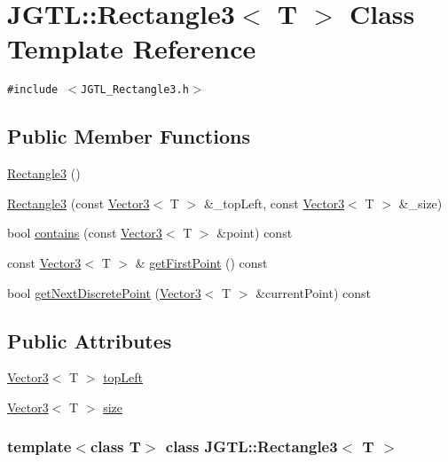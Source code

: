 \hypertarget{class_j_g_t_l_1_1_rectangle3}{
\section{JGTL::Rectangle3$<$ T $>$ Class Template Reference}
\label{class_j_g_t_l_1_1_rectangle3}
}
{\tt \#include $<$JGTL\_\-Rectangle3.h$>$}

\subsection*{Public Member Functions}
\begin{CompactItemize}
\item 
\hyperlink{class_j_g_t_l_1_1_rectangle3_95d1120ba01aa98bfd5a459b0c9a6a12}{Rectangle3} ()
\item 
\hyperlink{class_j_g_t_l_1_1_rectangle3_7907c71bb953badbd9f68501e0bb9b8a}{Rectangle3} (const \hyperlink{class_j_g_t_l_1_1_vector3}{Vector3}$<$ T $>$ \&\_\-top\-Left, const \hyperlink{class_j_g_t_l_1_1_vector3}{Vector3}$<$ T $>$ \&\_\-size)
\item 
bool \hyperlink{class_j_g_t_l_1_1_rectangle3_51f62ab3daf886c38057a72ecd0010d8}{contains} (const \hyperlink{class_j_g_t_l_1_1_vector3}{Vector3}$<$ T $>$ \&point) const 
\item 
const \hyperlink{class_j_g_t_l_1_1_vector3}{Vector3}$<$ T $>$ \& \hyperlink{class_j_g_t_l_1_1_rectangle3_66013d1d9cd1a51a4e1a9a2708098a6e}{get\-First\-Point} () const
\item 
bool \hyperlink{class_j_g_t_l_1_1_rectangle3_83b4f2996e51b68f6a14b0c1f1c35595}{get\-Next\-Discrete\-Point} (\hyperlink{class_j_g_t_l_1_1_vector3}{Vector3}$<$ T $>$ \&current\-Point) const 
\end{CompactItemize}
\subsection*{Public Attributes}
\begin{CompactItemize}
\item 
\hyperlink{class_j_g_t_l_1_1_vector3}{Vector3}$<$ T $>$ \hyperlink{class_j_g_t_l_1_1_rectangle3_9970035e43da1a163aa13b8bba5c1193}{top\-Left}
\item 
\hyperlink{class_j_g_t_l_1_1_vector3}{Vector3}$<$ T $>$ \hyperlink{class_j_g_t_l_1_1_rectangle3_9f63a1e076b374db4ebfa32de77ed4a5}{size}
\end{CompactItemize}
\subsubsection*{template$<$class T$>$ class JGTL::Rectangle3$<$ T $>$}



